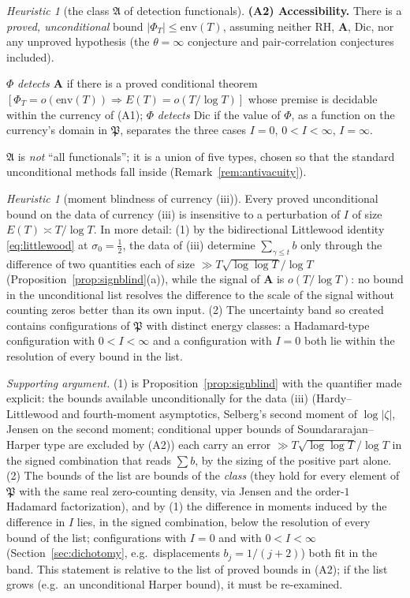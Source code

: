 \documentclass[11pt]{amsart}
\theoremstyle{plain}
\theoremstyle{definition}
\theoremstyle{remark}
\newtheorem{heuristic}[theorem]{Heuristic}
\newcommand{\RH}{\mathrm{RH}}
\newcommand{\Dic}{\mathrm{Dic}}
\newcommand{\Aax}{\mathbf{A}}
\begin{document}
\begin{heuristic}[the class $\mathfrak A$ of detection functionals]
\textbf{(A2) Accessibility.} There is a \emph{proved, unconditional} bound $|\Phi_T|\le\mathrm{env}(T)$, assuming neither $\RH$, $\Aax$, $\Dic$, nor any unproved hypothesis \textup{(}the $\theta=\infty$ conjecture \cite{Farmer1993} and pair-correlation conjectures included\textup{)}.

$\Phi$ \emph{detects $\Aax$} if there is a proved conditional theorem $[\Phi_T=o(\mathrm{env}(T))\Rightarrow E(T)=o(T/\log T)]$ whose premise is decidable within the currency of \textup{(A1)}; $\Phi$ \emph{detects $\Dic$} if the value of $\Phi$, as a function on the currency's domain in $\mathfrak P$, separates the three cases $I=0$, $0<I<\infty$, $I=\infty$.
\end{heuristic}

$\mathfrak A$ is \emph{not} ``all functionals''; it is a union of five types, chosen so that the standard unconditional methods fall inside (Remark~\ref{rem:antivacuity}).

\begin{heuristic}[moment blindness of currency \textup{(iii)}]\label{lem:momentblind}
Every proved unconditional bound on the data of currency \textup{(iii)} is insensitive to a perturbation of $I$ of size $E(T)\asymp T/\log T$. In more detail: \textup{(1)} by the bidirectional Littlewood identity \eqref{eq:littlewood} at $\sigma_0=\tfrac12$, the data of \textup{(iii)} determine $\sum_{\gamma\le t}b$ only through the difference of two quantities each of size $\gg T\sqrt{\log\log T}/\log T$ \textup{(}Proposition~\ref{prop:signblind}\textup{(a)}\textup{)}, while the signal of $\Aax$ is $o(T/\log T)$: no bound in the unconditional list resolves the difference to the scale of the signal without counting zeros better than its own input. \textup{(2)} The uncertainty band so created contains configurations of $\mathfrak P$ with distinct energy classes: a Hadamard-type configuration with $0<I<\infty$ and a configuration with $I=0$ both lie within the resolution of every bound in the list.
\end{heuristic}

\emph{Supporting argument.} (1) is Proposition~\ref{prop:signblind} with the quantifier made explicit: the bounds available unconditionally for the data (iii) (Hardy--Littlewood and fourth-moment asymptotics, Selberg's second moment of $\log|\zeta|$, Jensen on the second moment; conditional upper bounds of Soundararajan--Harper type are excluded by (A2)) each carry an error $\gg T\sqrt{\log\log T}/\log T$ in the signed combination that reads $\sum b$, by the sizing of the positive part alone. (2) The bounds of the list are bounds of the \emph{class} (they hold for every element of $\mathfrak P$ with the same real zero-counting density, via Jensen and the order-$1$ Hadamard factorization), and by (1) the difference in moments induced by the difference in $I$ lies, in the signed combination, below the resolution of every bound of the list; configurations with $I=0$ and with $0<I<\infty$ (Section~\ref{sec:dichotomy}, e.g.\ displacements $b_j=1/(j+2)$) both fit in the band. This statement is relative to the list of proved bounds in (A2); if the list grows \textup{(}e.g.\ an unconditional Harper bound\textup{)}, it must be re-examined.
\end{document}
